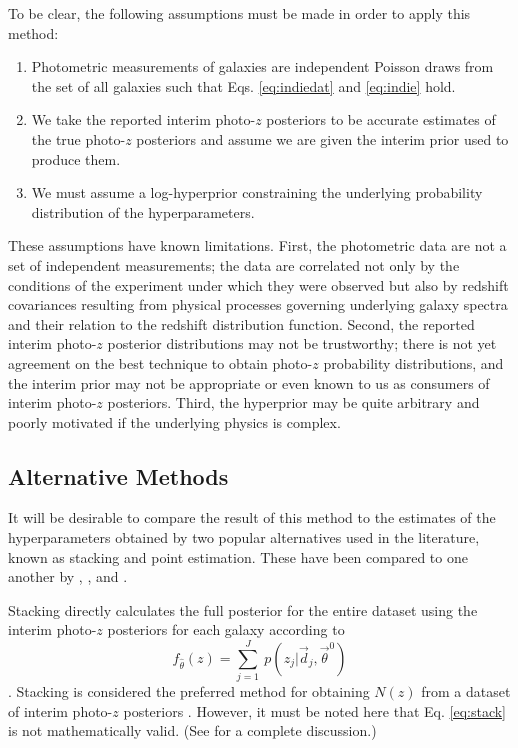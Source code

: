 \documentclass[preprint]{aastex}
\begin{document}
To be clear, the following assumptions must be made in order to apply this 
method:

\begin{enumerate}
\item Photometric measurements of galaxies are independent Poisson draws from 
the set of all galaxies such that Eqs. \ref{eq:indiedat} and \ref{eq:indie} 
hold.
\item We take the reported interim photo-$z$ posteriors to be accurate 
estimates of the true photo-$z$ posteriors and assume we are given the interim 
prior used to produce them.
\item We must assume a log-hyperprior constraining the underlying probability 
distribution of the hyperparameters.
\end{enumerate}

These assumptions have known limitations.  First, the photometric data are not 
a set of independent measurements; the data are correlated not only by the 
conditions of the experiment under which they were observed but also by 
redshift covariances resulting from physical processes governing underlying 
galaxy spectra and their relation to the redshift distribution function.  
Second, the reported interim photo-$z$ posterior distributions may not be 
trustworthy; there is not yet agreement on the best technique to obtain 
photo-$z$ probability distributions, and the interim prior may not be 
appropriate or even known to us as consumers of interim photo-$z$ posteriors.  
Third, the hyperprior may be quite arbitrary and poorly motivated if the 
underlying physics is complex.

\subsection{Alternative Methods}
\label{sec:sheldon}

It will be desirable to compare the result of this method to the estimates of 
the hyperparameters obtained by two popular alternatives used in the 
literature, known as stacking and point estimation.   These have been compared 
to one another by \citet{Hildebrandt2012}, \citet{Benjamin2013}, and 
\citet{Asorey2016}.

Stacking directly calculates the full posterior for the entire dataset using 
the interim photo-$z$ posteriors for each galaxy according to 
\begin{equation}\label{eq:stack} f_{\hat{\theta}}(z) = \sum_{j=1}^{J}\ 
p(z_{j}|\vec{d}_{j},\vec{\theta}^{0})\end{equation} \citep{Lima2008}.  Stacking 
is considered the preferred method for obtaining $N(z)$ from a dataset of 
interim photo-$z$ posteriors \citep{Sheldon2012, Kelly2014, Benjamin2013, 
Bonnett2015a, Viironen2015, Asorey2016}.  However, it must be noted here that 
Eq. \ref{eq:stack} is not mathematically valid.  (See \citet{Hogg2012} for a 
complete discussion.)  
\end{document}
